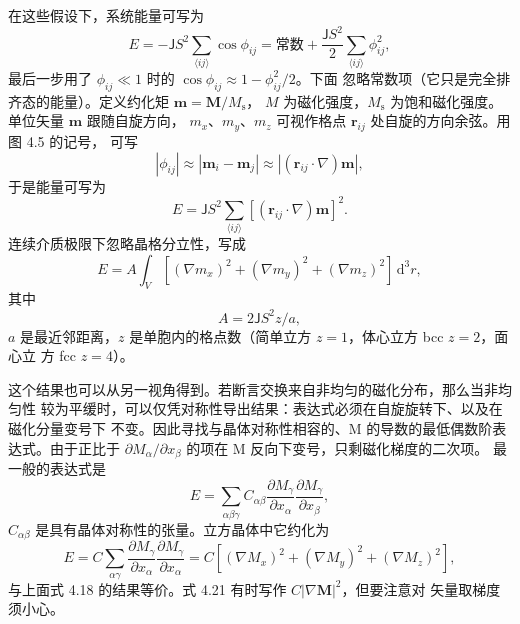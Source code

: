 在这些假设下，系统能量可写为
\begin{equation*}
E = -\mathsf{J}S^{2}\sum_{\langle ij\rangle}\cos\phi_{ij} = \text{常数} + \frac{\mathsf{J}S^{2}}{2}\sum_{\langle ij\rangle}\phi_{ij}^{2},\tag{4.15}
\end{equation*}
最后一步用了 $\phi_{ij}\ll1$ 时的 $\cos\phi_{ij}\approx1-\phi_{ij}^{2}/2$。下面
忽略常数项（它只是完全排齐态的能量）。定义约化矩 $\mathbf{m}=\mathbf{M}/M_{\mathrm{s}}$，
$M$ 为磁化强度，$M_{\mathrm{s}}$ 为饱和磁化强度。单位矢量 $\mathbf{m}$ 跟随自旋方向，
$m_x$、$m_y$、$m_z$ 可视作格点 $\mathbf{r}_{ij}$ 处自旋的方向余弦。用图 4.5 的记号，
可写
\begin{equation*}
|\phi_{ij}| \approx |\mathbf{m}_i-\mathbf{m}_j| \approx |(\mathbf{r}_{ij}\cdot\nabla)\mathbf{m}|,\tag{4.16}
\end{equation*}
于是能量可写为
\begin{equation*}
E = \mathsf{J}S^{2}\sum_{\langle ij\rangle}[(\mathbf{r}_{ij}\cdot\nabla)\mathbf{m}]^{2}.\tag{4.17}
\end{equation*}
连续介质极限下忽略晶格分立性，写成
\begin{equation*}
E = A\int_{V}[(\nabla m_x)^{2}+(\nabla m_y)^{2}+(\nabla m_z)^{2}]\,\mathrm{d}^{3}r,\tag{4.18}
\end{equation*}
其中
\begin{equation*}
A = 2\mathsf{J}S^{2}z/a,\tag{4.19}
\end{equation*}
$a$ 是最近邻距离，$z$ 是单胞内的格点数（简单立方 $z=1$，体心立方 bcc $z=2$，面心立
方 fcc $z=4$）。

这个结果也可以从另一视角得到。若断言交换来自非均匀的磁化分布，那么当非均匀性
较为平缓时，可以仅凭对称性导出结果：表达式必须在自旋旋转下、以及在磁化分量变号下
不变。因此寻找与晶体对称性相容的、M 的导数的最低偶数阶表达式。由于正比于
$\partial M_{\alpha}/\partial x_{\beta}$ 的项在 M 反向下变号，只剩磁化梯度的二次项。
最一般的表达式是
\begin{equation*}
E = \sum_{\alpha\beta\gamma}C_{\alpha\beta}\frac{\partial M_{\gamma}}{\partial x_{\alpha}}\frac{\partial M_{\gamma}}{\partial x_{\beta}},\tag{4.20}
\end{equation*}
$C_{\alpha\beta}$ 是具有晶体对称性的张量。立方晶体中它约化为
\begin{equation*}
E = C\sum_{\alpha\gamma}\frac{\partial M_{\gamma}}{\partial x_{\alpha}}\frac{\partial M_{\gamma}}{\partial x_{\alpha}} = C\left[(\nabla M_x)^{2}+(\nabla M_y)^{2}+(\nabla M_z)^{2}\right],\tag{4.21}
\end{equation*}
与上面式 4.18 的结果等价。式 4.21 有时写作 $C|\nabla\mathbf{M}|^{2}$，但要注意对
矢量取梯度须小心。

